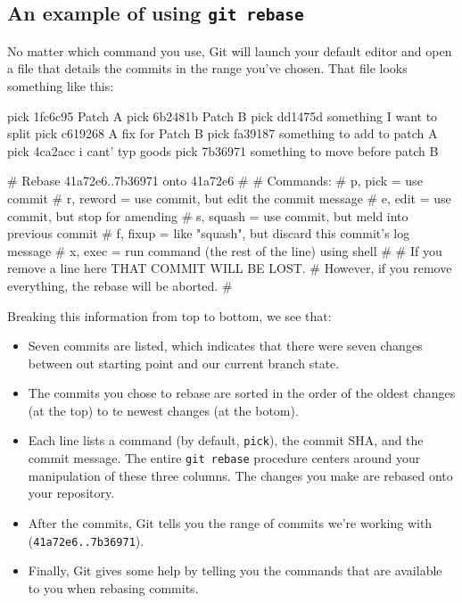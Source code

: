 \subsection{An example of using \texttt{git rebase}}
No matter which command you use, Git will launch your default editor and open a file that details the commits in the range you've chosen. That file looks something like this:
\begin{exampleblock}
    \begin{codeblock}[language=bash]
pick 1fc6c95 Patch A
pick 6b2481b Patch B
pick dd1475d something I want to split
pick c619268 A fix for Patch B
pick fa39187 something to add to patch A
pick 4ca2acc i cant' typ goods
pick 7b36971 something to move before patch B

# Rebase 41a72e6..7b36971 onto 41a72e6
#
# Commands:
#  p, pick = use commit
#  r, reword = use commit, but edit the commit message
#  e, edit = use commit, but stop for amending
#  s, squash = use commit, but meld into previous commit
#  f, fixup = like "squash", but discard this commit's log message
#  x, exec = run command (the rest of the line) using shell
#
# If you remove a line here THAT COMMIT WILL BE LOST.
# However, if you remove everything, the rebase will be aborted.
#
    \end{codeblock}
\end{exampleblock}

Breaking this information from top to bottom, we see that:
\begin{itemize}
    \item Seven commits are listed, which indicates that there were seven changes between out starting point and our current branch state.
    \item The commits you chose to rebase are sorted in the order of the oldest changes (at the top) to te newest changes (at the botom).
    \item Each line lists a command (by default, \texttt{pick}), the commit SHA, and the commit message. The entire \texttt{git rebase} procedure centers around your manipulation of these three columns. The changes you make are rebased onto your repository. 
    \item After the commits, Git tells you the range of commits we're working with (\texttt{41a72e6..7b36971}).
    \item Finally, Git gives some help by telling you the commands that are available to you when rebasing commits. 
\end{itemize}


